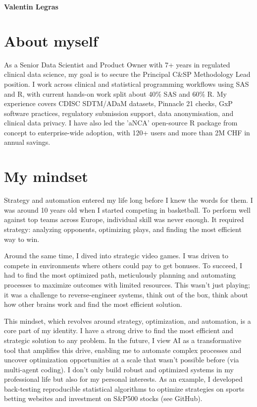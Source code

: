 \documentclass[11pt,a4paper]{article}
\newcommand{\Position}{Principal C\&SP Methodology Lead}
\begin{document}
{\Large\bfseries\color{accent} Valentin Legras}\\[10pt]

\section{About myself}
As a Senior Data Scientist and Product Owner with 7+ years in regulated clinical
data science, my goal is to secure the \Position{} position. I work across
clinical and statistical programming workflows using SAS and R, with current
hands-on work split about 40\% SAS and 60\% R. My experience covers CDISC
SDTM/ADaM datasets, Pinnacle 21 checks, GxP software practices, regulatory
submission support, data anonymisation, and clinical data privacy. I have also
led the 'aNCA' open-source R package from concept to enterprise-wide adoption,
with 120+ users and more than 2M CHF in annual savings.

\section{My mindset}
Strategy and automation entered my life long before I knew the words for them. I
was around 10 years old when I started competing in basketball. To perform well
against top teams across Europe, individual skill was never enough. It required
strategy: analyzing opponents, optimizing plays, and finding the most efficient
way to win.

Around the same time, I dived into strategic video games. I was driven to compete
in environments where others could pay to get bonuses. To succeed, I had to find
the most optimized path, meticulously planning and automating processes to
maximize outcomes with limited resources. This wasn't just playing; it was a
challenge to reverse-engineer systems, think out of the box, think about how
other brains work and find the most efficient solution.

This mindset, which revolves around strategy, optimization, and automation, is a
core part of my identity. I have a strong drive to find the most efficient and
strategic solution to any problem. In the future, I view AI as a transformative
tool that amplifies this drive, enabling me to automate complex processes and
uncover optimization opportunities at a scale that wasn't possible before (via
multi-agent coding). I don't only build robust and optimized systems in my
professional life but also for my personal interests. As an example, I developed
back-testing reproducible statistical algorithms to optimize strategies on sports
betting websites and investment on S\&P500 stocks (see GitHub).
\end{document}
